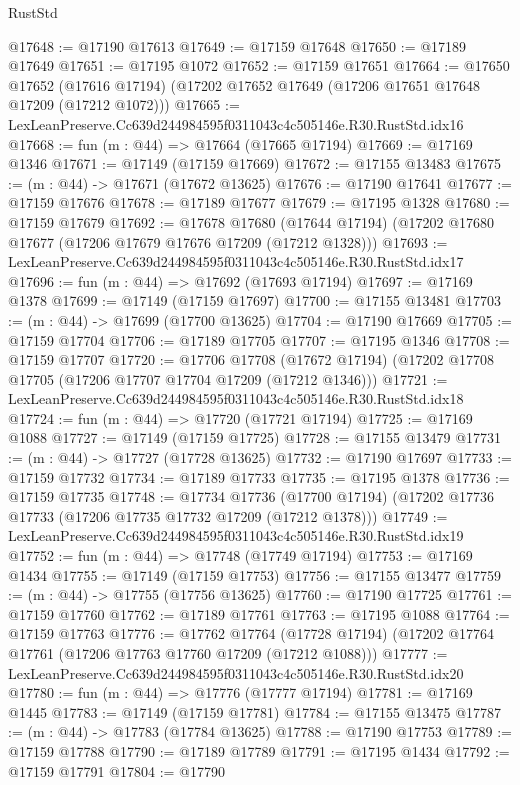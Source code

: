 \begin{lexlean}{RustStd}
\begin{coremodule}
@17648 := @17190 @17613
@17649 := @17159 @17648
@17650 := @17189 @17649
@17651 := @17195 @1072
@17652 := @17159 @17651
@17664 := @17650
    @17652
    (@17616 @17194)
    (@17202 @17652 @17649 (@17206 @17651 @17648 @17209 (@17212 @1072)))
@17665 := LexLeanPreserve.Cc639d244984595f0311043c4c505146e.R30.RustStd.idx16
@17668 := fun (m : @44) => @17664 (@17665 @17194)
@17669 := @17169 @1346
@17671 := @17149 (@17159 @17669)
@17672 := @17155 @13483
@17675 := (m : @44) -> @17671 (@17672 @13625)
@17676 := @17190 @17641
@17677 := @17159 @17676
@17678 := @17189 @17677
@17679 := @17195 @1328
@17680 := @17159 @17679
@17692 := @17678
    @17680
    (@17644 @17194)
    (@17202 @17680 @17677 (@17206 @17679 @17676 @17209 (@17212 @1328)))
@17693 := LexLeanPreserve.Cc639d244984595f0311043c4c505146e.R30.RustStd.idx17
@17696 := fun (m : @44) => @17692 (@17693 @17194)
@17697 := @17169 @1378
@17699 := @17149 (@17159 @17697)
@17700 := @17155 @13481
@17703 := (m : @44) -> @17699 (@17700 @13625)
@17704 := @17190 @17669
@17705 := @17159 @17704
@17706 := @17189 @17705
@17707 := @17195 @1346
@17708 := @17159 @17707
@17720 := @17706
    @17708
    (@17672 @17194)
    (@17202 @17708 @17705 (@17206 @17707 @17704 @17209 (@17212 @1346)))
@17721 := LexLeanPreserve.Cc639d244984595f0311043c4c505146e.R30.RustStd.idx18
@17724 := fun (m : @44) => @17720 (@17721 @17194)
@17725 := @17169 @1088
@17727 := @17149 (@17159 @17725)
@17728 := @17155 @13479
@17731 := (m : @44) -> @17727 (@17728 @13625)
@17732 := @17190 @17697
@17733 := @17159 @17732
@17734 := @17189 @17733
@17735 := @17195 @1378
@17736 := @17159 @17735
@17748 := @17734
    @17736
    (@17700 @17194)
    (@17202 @17736 @17733 (@17206 @17735 @17732 @17209 (@17212 @1378)))
@17749 := LexLeanPreserve.Cc639d244984595f0311043c4c505146e.R30.RustStd.idx19
@17752 := fun (m : @44) => @17748 (@17749 @17194)
@17753 := @17169 @1434
@17755 := @17149 (@17159 @17753)
@17756 := @17155 @13477
@17759 := (m : @44) -> @17755 (@17756 @13625)
@17760 := @17190 @17725
@17761 := @17159 @17760
@17762 := @17189 @17761
@17763 := @17195 @1088
@17764 := @17159 @17763
@17776 := @17762
    @17764
    (@17728 @17194)
    (@17202 @17764 @17761 (@17206 @17763 @17760 @17209 (@17212 @1088)))
@17777 := LexLeanPreserve.Cc639d244984595f0311043c4c505146e.R30.RustStd.idx20
@17780 := fun (m : @44) => @17776 (@17777 @17194)
@17781 := @17169 @1445
@17783 := @17149 (@17159 @17781)
@17784 := @17155 @13475
@17787 := (m : @44) -> @17783 (@17784 @13625)
@17788 := @17190 @17753
@17789 := @17159 @17788
@17790 := @17189 @17789
@17791 := @17195 @1434
@17792 := @17159 @17791
@17804 := @17790

\end{coremodule}
\end{lexlean}
